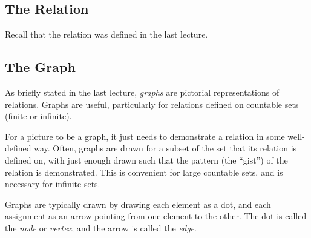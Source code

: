 \documentclass[letterpaper,twoside]{article}
\newenvironment{SorrellEnumerate}
{
    \setlength\parskip{-5pt}
    \begin{enumerate}
        \setlength\itemsep{-4pt}
}{
    \end{enumerate}
}
\begin{document}
\newpage
{}
\tableofcontents
\newpage
\restoregeometry
{}
\setcounter{page}{1}

\begin{multicols*}{2}




\section{The Relation}

Recall that the relation was defined in the last lecture.

\subsection{The Graph}

As briefly stated in the last lecture, \textit{graphs} are pictorial representations of relations.
Graphs are useful, particularly for relations defined on countable sets (finite or infinite).

For a picture to be a graph, it just needs to demonstrate a relation in some well-defined way.
Often, graphs are drawn for a subset of the set that its relation is defined on, with just enough drawn such that the pattern (the ``gist'') of the relation is demonstrated.
This is convenient for large countable sets, and is necessary for infinite sets.

Graphs are typically drawn by drawing each element as a dot, and each assignment as an arrow pointing from one element to the other.
The dot is called the \textit{node} or \textit{vertex}, and the arrow is called the \textit{edge}.


\end{multicols*}
\end{document}
